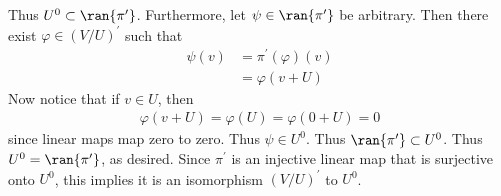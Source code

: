 \documentclass{book}
\begin{document}
\begin{enumerate}[label=\arabic*)]
\begin{enumerate}[label=\alph*)]
          Thus $U^0 \subset \ran{\pi^{\prime}}$. Furthermore, let $\psi \in \ran{\pi^{\prime}}$ be arbitrary. Then there exist $\varphi \in (V/U)^{\prime}$ such that
          \begin{align*}
            \psi(v) & = \pi^{\prime}(\varphi)(v) \\
            & = \varphi(v + U)
          \end{align*}
          Now notice that if $v \in U$, then 
          \begin{align*}
            \varphi(v + U) = \varphi(U) = \varphi(0 + U) = 0 
          \end{align*}
          since linear maps map zero to zero. Thus $\psi \in U^0$. Thus $\ran{\pi^{\prime}} \subset U^0$. Thus $U^0 = \ran{\pi^{\prime}}$, as desired.
        \ii
          Since $\pi^{\prime}$ is an injective linear map that is surjective onto $U^0$, this implies it is an isomorphism $(V/U)^{\prime}$ to $U^0$.
      \end{enumerate}
  \end{enumerate}
\end{document}
